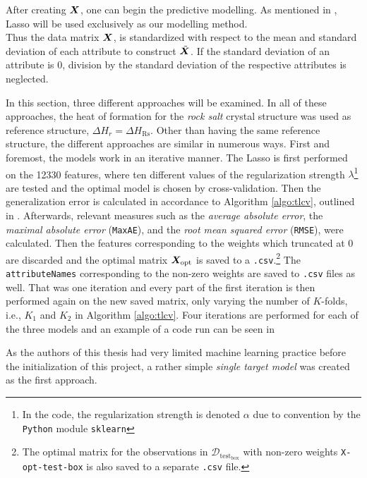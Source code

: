 After creating $\bm{X}$, one can begin the predictive modelling. As mentioned in , Lasso will be used exclusively as our modelling method. \\ 
Thus the data matrix $\bm{X}$, is standardized with respect to the mean and standard deviation of each attribute to construct $\tilde{\bm{X}}$. If the standard deviation of an attribute is 0, division by the standard deviation of the respective attributes is neglected.

In this section, three different approaches will be examined. In all of these approaches, the heat of formation for the \emph{rock salt} crystal structure was used as reference structure, $\Delta H_{r} = \Delta H_{\mathrm{Rs}}$. Other than having the same reference structure, the different approaches are similar in numerous ways. First and foremost, the models work in an iterative manner. The Lasso is first performed on the 12330 features, where ten different values of the regularization strength $\lambda$\footnote{In the code, the regularization strength is denoted $\alpha$ due to convention by the \texttt{Python} module \texttt{sklearn}} are tested and the optimal model is chosen by cross-validation. Then the generalization error is calculated in accordance to Algorithm \ref{algo:tlcv}, outlined in . Afterwards, relevant measures such as the \emph{average absolute error}, the \emph{maximal absolute error} (\texttt{MaxAE}), and the \emph{root mean squared error} (\texttt{RMSE}), were calculated. Then the features corresponding to the weights which truncated at 0 are discarded and the optimal matrix $\bm{X}_{\mathrm{opt}}$ is saved to a \texttt{.csv}.\footnote{The optimal matrix for the observations in $\mathcal{D}_{\mathrm{test_{box}}}$ with non-zero weights \texttt{X-opt-test-box} is also saved to a separate \texttt{.csv} file.} The \texttt{attributeNames} corresponding to the non-zero weights are saved to \texttt{.csv} files as well. That was one iteration and every part of the first iteration is then performed again on the new saved matrix, only varying the number of $K$-folds, i.e., $K_1$ and $K_2$ in Algorithm \ref{algo:tlcv}. Four iterations are performed for each of the three models and an example of a code run can be seen in 

As the authors of this thesis had very limited machine learning practice before the initialization of this project, a rather simple \emph{single target model} was created as the first approach. 

